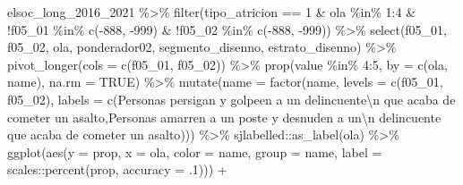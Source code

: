\documentclass[
  12pt,
]{book}
\newenvironment{Shaded}{\begin{snugshade}}{\end{snugshade}}
\newcommand{\AttributeTok}[1]{\textcolor[rgb]{0.77,0.63,0.00}{#1}}
\newcommand{\ConstantTok}[1]{\textcolor[rgb]{0.00,0.00,0.00}{#1}}
\newcommand{\DecValTok}[1]{\textcolor[rgb]{0.00,0.00,0.81}{#1}}
\newcommand{\FunctionTok}[1]{\textcolor[rgb]{0.00,0.00,0.00}{#1}}
\newcommand{\NormalTok}[1]{#1}
\newcommand{\SpecialCharTok}[1]{\textcolor[rgb]{0.00,0.00,0.00}{#1}}
\newcommand{\StringTok}[1]{\textcolor[rgb]{0.31,0.60,0.02}{#1}}
\begin{document}
\begin{Shaded}
\begin{Highlighting}[]
\NormalTok{elsoc\_long\_2016\_2021 }\SpecialCharTok{\%\textgreater{}\%} 
  \FunctionTok{filter}\NormalTok{(tipo\_atricion }\SpecialCharTok{==} \DecValTok{1} \SpecialCharTok{\&}\NormalTok{ ola }\SpecialCharTok{\%in\%} \DecValTok{1}\SpecialCharTok{:}\DecValTok{4} \SpecialCharTok{\&}
           \SpecialCharTok{!}\NormalTok{f05\_01 }\SpecialCharTok{\%in\%} \FunctionTok{c}\NormalTok{(}\SpecialCharTok{{-}}\DecValTok{888}\NormalTok{, }\SpecialCharTok{{-}}\DecValTok{999}\NormalTok{) }\SpecialCharTok{\&} \SpecialCharTok{!}\NormalTok{f05\_02 }\SpecialCharTok{\%in\%} \FunctionTok{c}\NormalTok{(}\SpecialCharTok{{-}}\DecValTok{888}\NormalTok{, }\SpecialCharTok{{-}}\DecValTok{999}\NormalTok{)) }\SpecialCharTok{\%\textgreater{}\%}  
  \FunctionTok{select}\NormalTok{(f05\_01, f05\_02, ola, ponderador02, segmento\_disenno, estrato\_disenno) }\SpecialCharTok{\%\textgreater{}\%} 
  \FunctionTok{pivot\_longer}\NormalTok{(}\AttributeTok{cols =} \FunctionTok{c}\NormalTok{(f05\_01, f05\_02)) }\SpecialCharTok{\%\textgreater{}\%} 
  \FunctionTok{prop}\NormalTok{(value }\SpecialCharTok{\%in\%} \DecValTok{4}\SpecialCharTok{:}\DecValTok{5}\NormalTok{, }\AttributeTok{by =} \FunctionTok{c}\NormalTok{(ola, name), }\AttributeTok{na.rm =} \ConstantTok{TRUE}\NormalTok{) }\SpecialCharTok{\%\textgreater{}\%} 
  \FunctionTok{mutate}\NormalTok{(}\AttributeTok{name =} \FunctionTok{factor}\NormalTok{(name,}
                       \AttributeTok{levels =} \FunctionTok{c}\NormalTok{(}\StringTok{\textquotesingle{}f05\_01\textquotesingle{}}\NormalTok{, }\StringTok{\textquotesingle{}f05\_02\textquotesingle{}}\NormalTok{),}
                       \AttributeTok{labels =} \FunctionTok{c}\NormalTok{(}\StringTok{\textquotesingle{}Personas persigan y golpeen a un delincuente}\SpecialCharTok{\textbackslash{}n}\StringTok{ que acaba de cometer un asalto\textquotesingle{}}\NormalTok{,}\StringTok{\textquotesingle{}Personas amarren a un poste y desnuden a un}\SpecialCharTok{\textbackslash{}n}\StringTok{ delincuente que acaba de cometer un asalto\textquotesingle{}}\NormalTok{))) }\SpecialCharTok{\%\textgreater{}\%} 
\NormalTok{sjlabelled}\SpecialCharTok{::}\FunctionTok{as\_label}\NormalTok{(ola) }\SpecialCharTok{\%\textgreater{}\%} 
  \FunctionTok{ggplot}\NormalTok{(}\FunctionTok{aes}\NormalTok{(}\AttributeTok{y =}\NormalTok{ prop, }\AttributeTok{x =}\NormalTok{ ola, }\AttributeTok{color =}\NormalTok{ name, }\AttributeTok{group =}\NormalTok{ name,}
             \AttributeTok{label =}\NormalTok{ scales}\SpecialCharTok{::}\FunctionTok{percent}\NormalTok{(prop, }\AttributeTok{accuracy =}\NormalTok{ .}\DecValTok{1}\NormalTok{))) }\SpecialCharTok{+}

\end{Highlighting}
\end{Shaded}
\end{document}
